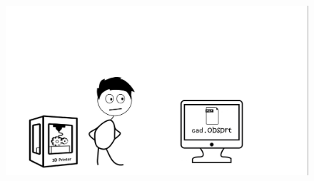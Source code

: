 \begin{frame}
\begin{figure}

\vspace{-.7cm}	
\hspace{-2cm}		\includegraphics[width=1.2\linewidth]{Pictures/animations/animation_9.png}
		\end{figure}

\end{frame}

